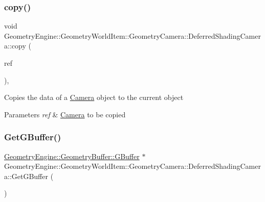 \subsubsection{\texorpdfstring{copy()}{copy()}}
{\footnotesize\ttfamily void Geometry\+Engine\+::\+Geometry\+World\+Item\+::\+Geometry\+Camera\+::\+Deferred\+Shading\+Camera\+::copy (\begin{DoxyParamCaption}\item[{const \mbox{\hyperlink{class_geometry_engine_1_1_geometry_world_item_1_1_geometry_camera_1_1_deferred_shading_camera}{Deferred\+Shading\+Camera}} \&}]{ref }\end{DoxyParamCaption})\hspace{0.3cm}{\ttfamily [protected]}, {\ttfamily [virtual]}}

Copies the data of a \mbox{\hyperlink{class_geometry_engine_1_1_geometry_world_item_1_1_geometry_camera_1_1_camera}{Camera}} object to the current object 
\begin{DoxyParams}{Parameters}
{\em ref} & \mbox{\hyperlink{class_geometry_engine_1_1_geometry_world_item_1_1_geometry_camera_1_1_camera}{Camera}} to be copied \\
\hline
\end{DoxyParams}
\mbox{\label{class_geometry_engine_1_1_geometry_world_item_1_1_geometry_camera_1_1_deferred_shading_camera_aa37bfbf062ca20f0d41d5f29fbbc7959}} 
\subsubsection{\texorpdfstring{GetGBuffer()}{GetGBuffer()}}
{\footnotesize\ttfamily \mbox{\hyperlink{class_geometry_engine_1_1_geometry_buffer_1_1_g_buffer}{Geometry\+Engine\+::\+Geometry\+Buffer\+::\+G\+Buffer}} $\ast$ Geometry\+Engine\+::\+Geometry\+World\+Item\+::\+Geometry\+Camera\+::\+Deferred\+Shading\+Camera\+::\+Get\+G\+Buffer (\begin{DoxyParamCaption}{ }\end{DoxyParamCaption})\hspace{0.3cm}{\ttfamily [virtual]}}


